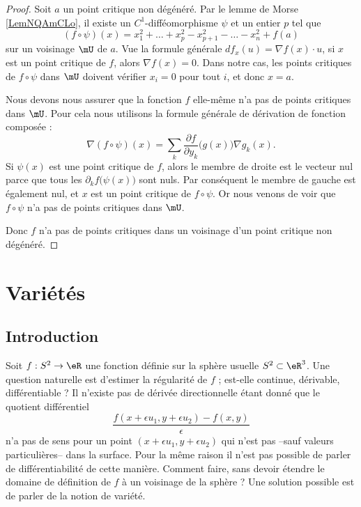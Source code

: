 \begin{proof}
    Soit \( a\) un point critique non dégénéré. Par le lemme de Morse \ref{LemNQAmCLo}, il existe un \( C^1\)-difféomorphisme \( \psi\) et un entier \( p\) tel que
    \begin{equation}
        (f\circ \psi)(x)=x_1^2+\ldots +x_p^2-x_{p+1}^2-\ldots -x_n^2+f(a)
    \end{equation}
    sur un voisinage \( \mU\) de \( a\). Vue la formule générale \( df_x(u)=\nabla f(x)\cdot u\), si \( x\) est un point critique de \( f\), alors \( \nabla f(x)=0\). Dans notre cas, les points critiques de \( f\circ \psi\) dans \( \mU\) doivent vérifier \( x_i=0\) pour tout \( i\), et donc \( x=a\).

    Nous devons nous assurer que la fonction \( f\) elle-même n'a pas de points critiques dans \( \mU\). Pour cela nous utilisons la formule générale de dérivation de fonction composée :
    \begin{equation}
        \nabla(f\circ\psi)(x)=\sum_k \frac{ \partial f }{ \partial y_k }\big( g(x) \big)\nabla g_k(x).
    \end{equation}
    Si \( \psi(x)\) est une point critique de \( f\), alors le membre de droite est le vecteur nul parce que tous les \( \partial_kf\big( \psi(x) \big)\) sont nuls. Par conséquent le membre de gauche est également nul, et \( x\) est un point critique de \( f\circ\psi\). Or nous venons de voir que \( f\circ\psi\) n'a pas de points critiques dans \( \mU\).

    Donc \( f\) n'a pas de points critiques dans un voisinage d'un point critique non dégénéré.
\end{proof}

\section{Variétés}

\subsection{Introduction}
Soit $f : S^2 \to \eR$ une fonction définie sur la sphère usuelle
$S^2 \subset \eR^3$. Une question naturelle est d'estimer la
régularité de $f$ ; est-elle continue, dérivable, différentiable ? Il
n'existe pas de dérivée directionnelle étant donné que le quotient
différentiel
\begin{equation*}
  \frac{f(x + \epsilon u_1 ,y + \epsilon u_2) - f(x,y)}{\epsilon}
\end{equation*}
n'a pas de sens pour un point $(x + \epsilon u_1 ,y + \epsilon u_2)$
qui n'est pas --sauf valeurs particulières-- dans la surface. Pour la
même raison il n'est pas possible de parler de différentiabilité de
cette manière. Comment faire, sans devoir étendre le domaine de
définition de $f$ à un voisinage de la sphère ? Une solution possible
est de parler de la notion de variété.

